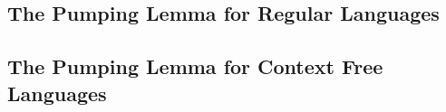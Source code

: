 \documentclass[../butidigress.tex]{subfiles}
\begin{document}
\subsection*{The Pumping Lemma for Regular Languages}

\subsection*{The Pumping Lemma for Context Free Languages}
\end{document}
